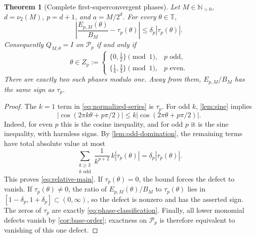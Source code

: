 \documentclass[11pt,a4paper]{article}
\numberwithin{equation}{section}
\theoremstyle{plain}
\newtheorem{theorem}{Theorem}[section]
\theoremstyle{definition}
\theoremstyle{remark}
\newcommand{\N}{\mathbb N}
\newcommand{\T}{\mathbb T}
\newcommand{\Poly}{\mathcal P}
\begin{document}
\begin{theorem}[Complete first-superconvergent phases]\label{thm:complete-phases}
Let $M\in\N_{>0}$, $d=\nu_2(M)$, $p=d+1$, and $a=M/2^d$.
For every $\theta\in\T$,
\begin{equation}\label{eq:relative-main}
 \left|\frac{E_{p,M}(\theta)}{B_M}-\tau_p(\theta)\right|
 \le\delta_p|\tau_p(\theta)|.
\end{equation}
Consequently $Q_{M,\theta}=I$ on $\Poly_p$ if and only if
\begin{equation}\label{eq:phase-classification}
 \theta\in Z_p:=
 \begin{cases}
 \{0,\tfrac12\}\pmod1,&p\text{ odd},\\[2pt]
 \{\tfrac14,\tfrac34\}\pmod1,&p\text{ even}.
 \end{cases}
\end{equation}
There are exactly two such phases modulo one. Away from them,
$E_{p,M}/B_M$ has the same sign as $\tau_p$.
\end{theorem}
\begin{proof}
The $k=1$ term in \eqref{eq:normalized-series} is $\tau_p$.
For odd $k$, \cref{lem:sine} implies
\[
 |\cos(2\pi k\theta+p\pi/2)|\le
 k|\cos(2\pi\theta+p\pi/2)|.
\]
Indeed, for even $p$ this is the cosine inequality, and for odd $p$ it is
the sine inequality, with harmless signs. By
\cref{lem:odd-domination}, the remaining terms have total absolute value
at most
\[
 \sum_{\substack{k\ge3\\k\text{ odd}}}
 \frac{1}{k^{p+2}}\,k|\tau_p(\theta)|
 =\delta_p|\tau_p(\theta)|.
\]
This proves \eqref{eq:relative-main}. If $\tau_p(\theta)=0$, the bound
forces the defect to vanish. If $\tau_p(\theta)\ne0$, the ratio of
$E_{p,M}(\theta)/B_M$ to $\tau_p(\theta)$ lies in
$[1-\delta_p,1+\delta_p]\subset(0,\infty)$, so the defect is nonzero
and has the asserted sign. The zeros of $\tau_p$ are exactly
\eqref{eq:phase-classification}. Finally, all lower monomial defects
vanish by \cref{cor:base-order}; exactness on $\Poly_p$ is therefore
equivalent to vanishing of this one defect.
\end{proof}
\end{document}
